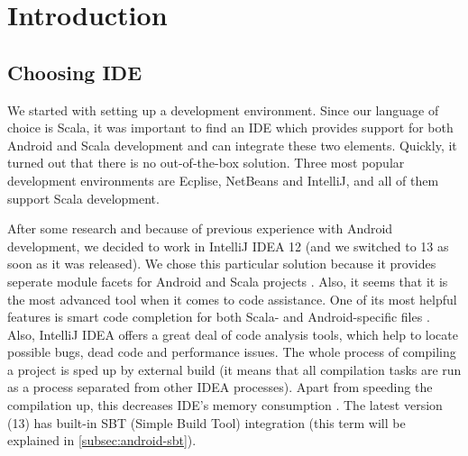 %
%
%
%
%

\section{Introduction}
\label{sec:impl-intro}

\subsection{Choosing IDE}
\label{subsec:choosing-ide}
We started with setting up a development environment. Since our language of choice is Scala, it was important to find an IDE which provides support for both Android and Scala development and can integrate these two elements. Quickly, it turned out that there is no out-of-the-box solution. Three most popular development environments are Ecplise, NetBeans and IntelliJ, and all of them support Scala development. 

After some research and because of previous experience with Android development, we decided to work in IntelliJ IDEA 12 (and we switched to 13 as soon as it was released). We chose this particular solution because it provides seperate module facets for Android and Scala projects \cite{Steingress:2011:AndroidScala}. Also, it seems that it is the most advanced tool when it comes to code assistance. One of its most helpful features is smart code completion for both Scala- and Android-specific files \cite{Steingress:2011:AndroidScala}. Also, IntelliJ IDEA offers a great deal of code analysis tools, which help to locate possible bugs, dead code and performance issues. The whole process of compiling a project is sped up by external build (it means that all compilation tasks are run as a process separated from other IDEA processes). Apart from speeding the compilation up, this decreases IDE's memory consumption \cite{Fatin:2012:NewWay}. The latest version (13) has built-in SBT (Simple Build Tool) integration (this term will be explained in \cref{subsec:android-sbt}).


